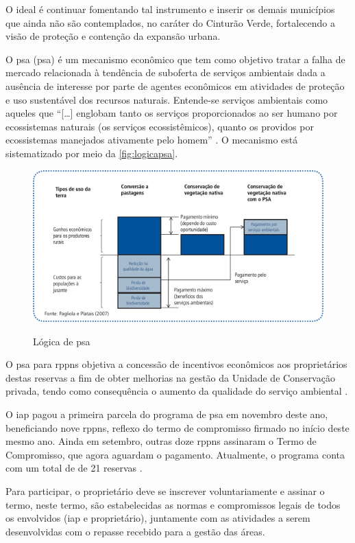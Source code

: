 	O ideal é continuar fomentando tal instrumento e inserir os demais municípios que ainda não são contemplados, no caráter do Cinturão Verde, fortalecendo a visão de proteção e contenção da expansão urbana.
	
	O \glsdesc{psa} (\gls{psa}) é um mecanismo econômico que tem como objetivo tratar a falha de mercado relacionada à tendência de suboferta de serviços ambientais dada a ausência de interesse por parte de agentes econômicos em atividades de proteção e uso sustentável dos recursos naturais. Entende-se serviços ambientais como aqueles que ``[\dots] englobam tanto os serviços proporcionados ao ser humano por ecossistemas naturais (os serviços ecossistêmicos), quanto os providos por ecossistemas manejados ativamente pelo homem'' \cite[p. 17]{prem2011a}. O mecanismo está sistematizado por meio da \autoref{fig:logicapsa}.
	
	\begin{figure}
		\centering
		\caption{Lógica de \gls{psa}}
		\includegraphics[width=0.9\linewidth]{img/prem2011a_01}
		\label{fig:logicapsa}
	\end{figure}
	
	O \glsdesc{psa} para \gls{rppn}s objetiva a concessão de incentivos econômicos aos proprietários destas reservas a fim de obter melhorias na gestão da Unidade de Conservação privada, tendo como consequência o aumento da qualidade do serviço ambiental \cite{iappr2019b}.
	
	O \gls{iap} pagou a primeira parcela do programa de \gls{psa} em novembro deste ano, beneficiando nove \gls{rppn}s, reflexo do termo de compromisso firmado no início deste mesmo ano. Ainda em setembro, outras doze \gls{rppn}s assinaram o Termo de Compromisso, que agora aguardam o pagamento. Atualmente, o programa conta com um total de de 21 reservas \cite{aen2019a}.
	
	Para participar, o proprietário deve se inscrever voluntariamente e assinar o termo, neste termo, são estabelecidas as normas e compromissos legais de todos os envolvidos (\gls{iap} e proprietário), juntamente com as atividades a serem desenvolvidas com o repasse recebido para a gestão das áreas. 
	
